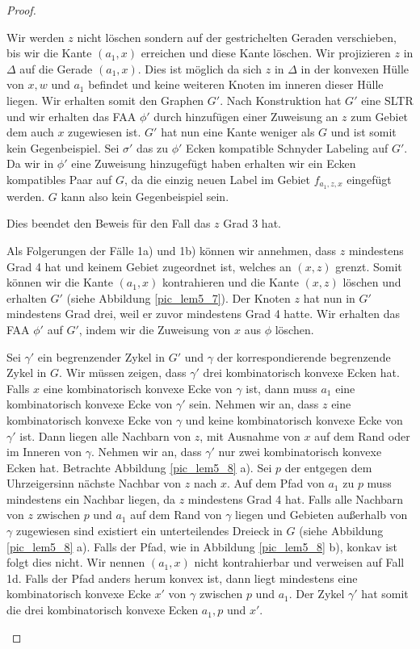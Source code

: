 \begin{proof}
\begin{description}[leftmargin =0pt, font = \bfseries]
Wir werden $z$ nicht löschen sondern auf der gestrichelten Geraden verschieben, bis wir die Kante $(a_1,x)$ erreichen und diese Kante löschen. Wir projizieren $z$ in $\Delta$ auf die Gerade $(a_1,x)$. Dies ist möglich da sich $z$ in $\Delta$ in der konvexen Hülle von $x,w$ und $a_1$ befindet und keine weiteren Knoten im inneren dieser Hülle liegen. Wir erhalten somit den Graphen $G'$. Nach Konstruktion hat $G'$ eine SLTR und wir erhalten das FAA $\phi'$ durch hinzufügen einer Zuweisung an $z$ zum Gebiet dem auch $x$ zugewiesen ist. $G'$ hat nun eine Kante weniger als $G$ und ist somit kein Gegenbeispiel. Sei $\sigma'$ das zu $\phi'$ Ecken kompatible Schnyder Labeling auf $G'$. Da wir in $\phi'$ eine Zuweisung hinzugefügt haben erhalten wir ein Ecken kompatibles Paar auf $G$, da die einzig neuen Label im Gebiet $f_{a_1,z,x}$ eingefügt werden. $G$ kann also kein Gegenbeispiel sein.

Dies beendet den Beweis für den Fall das $z$ Grad 3 hat.

\item[Fall 1c] Als Folgerungen der Fälle 1a) und 1b) können wir annehmen, dass $z$ mindestens Grad 4 hat und keinem Gebiet zugeordnet ist, welches an $(x,z)$ grenzt. Somit können wir die Kante $(a_1,x)$ kontrahieren und die Kante $(x,z)$ löschen und erhalten $G'$ (siehe Abbildung \ref{pic_lem5_7}). Der Knoten $z$ hat nun in $G'$ mindestens Grad drei, weil er zuvor mindestens Grad 4 hatte. Wir erhalten das FAA $\phi'$ auf $G'$, indem wir die Zuweisung von $x$ aus $\phi$ löschen. 

Sei $\gamma'$ ein begrenzender Zykel in $G'$ und $\gamma$ der korrespondierende begrenzende Zykel in $G$. Wir müssen zeigen, dass $\gamma'$ drei kombinatorisch konvexe Ecken hat. Falls $x$ eine kombinatorisch konvexe Ecke von $\gamma$ ist, dann muss $a_1$ eine kombinatorisch konvexe Ecke von $\gamma'$ sein. Nehmen wir an, dass $z$ eine kombinatorisch konvexe Ecke von $\gamma$ und keine kombinatorisch konvexe Ecke von $\gamma'$ ist. Dann liegen alle Nachbarn von $z$, mit Ausnahme von $x$ auf dem Rand oder im Inneren von $\gamma$. Nehmen wir an, dass $\gamma'$ nur zwei kombinatorisch konvexe Ecken hat. Betrachte Abbildung \ref{pic_lem5_8} a). Sei $p$ der entgegen dem Uhrzeigersinn nächste Nachbar von $z$ nach $x$. Auf dem Pfad von $a_1$ zu $p$ muss mindestens ein Nachbar liegen, da $z$ mindestens Grad 4 hat. Falls alle Nachbarn von $z$ zwischen $p$ und $a_1$ auf dem Rand von $\gamma$ liegen und Gebieten außerhalb von $\gamma$ zugewiesen sind existiert ein unterteilendes Dreieck in $G$ (siehe Abbildung \ref{pic_lem5_8} a). Falls der Pfad, wie in Abbildung \ref{pic_lem5_8} b), konkav ist folgt dies nicht. Wir nennen $(a_1,x)$ nicht kontrahierbar und verweisen auf Fall 1d. Falls der Pfad anders herum konvex ist, dann liegt mindestens eine kombinatorisch konvexe Ecke $x'$ von $\gamma$ zwischen $p$ und $a_1$. Der Zykel $\gamma'$ hat somit die drei kombinatorisch konvexe Ecken $a_1,p$ und $x'$. 


\end{description}
\end{proof}
